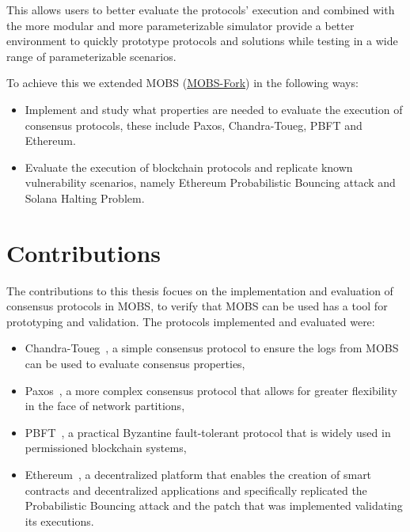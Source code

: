 This allows users to better evaluate the protocols' execution and combined with the more modular and more
parameterizable simulator provide a better environment to quickly prototype protocols and solutions while testing in
a wide range of parameterizable scenarios.

To achieve this we extended MOBS (\href{https://github.com/RMLoureiro/MOBS}{MOBS-Fork}) in the following ways:
\begin{itemize}
  \item Implement and study what properties are needed to evaluate the execution of consensus protocols, these include Paxos, Chandra-Toueg, PBFT and Ethereum.
  \item Evaluate the execution of blockchain protocols and replicate known
    vulnerability scenarios, namely Ethereum Probabilistic Bouncing attack\cite{ethereum_analysis} and 
    Solana Halting Problem\cite{solana_halting_problem}.
\end{itemize}



\section{Contributions}\label{sub:contributions}
The contributions to this thesis focues on the implementation and evaluation of consensus protocols in MOBS, to verify that MOBS can be used
has a tool for prototyping and validation. The protocols implemented and evaluated were:
\begin{itemize}
  \item Chandra-Toueg~\cite{chandra}, a simple consensus protocol to ensure the logs from MOBS can be used to evaluate consensus properties,
  \item Paxos~\cite{paxos}, a more complex consensus protocol that allows for greater flexibility in the face of network partitions,
  \item PBFT~\cite{pbft}, a practical Byzantine fault-tolerant protocol that is widely used in permissioned blockchain systems,
  \item Ethereum~\cite{ethereum}, a decentralized platform that enables the creation of smart contracts and decentralized applications and specifically
replicated the Probabilistic Bouncing attack and the patch that was implemented validating its executions.
\end{itemize}